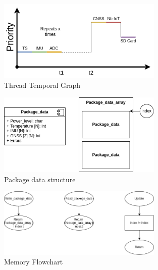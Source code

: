 \begin{figure}[H]
    \centering
    \includegraphics[width=0.7\textwidth]{images/diagrams/threads/graph/threads_graph.drawio.png}  %
    \caption{Thread Temporal Graph}
    \label{fig:Thread Temporal Graph}        
\end{figure}

\begin{figure}[H]
    \centering
    \includegraphics[width=0.7\textwidth]{images/diagrams/data_struct/package_data.drawio.png}  %
    \caption{Package data structure}
    \label{fig:Package data structure}        
\end{figure}


\begin{figure}[H]
    \centering
    \includegraphics[width=0.7\textwidth]{images/diagrams/data_struct/fluxogram.png}  %
    \caption{Memory Flowchart}
    \label{fig:Memory Flowchart}        
\end{figure}
